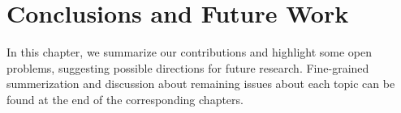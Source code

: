 \chapter{Conclusions and Future Work}
\label{chap:conclusions}

In this chapter, we summarize our contributions and highlight some
open problems, suggesting possible directions for future research.
Fine-grained summerization and discussion about remaining issues about
each topic can be found at the end of the corresponding chapters.






